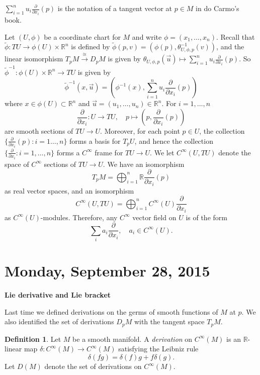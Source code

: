 \documentclass{amsart}
\numberwithin{equation}{section}
\newcommand{\bR}{\mathbb{R}}
\theoremstyle{definition}
\newtheorem{definition}{Definition} [section]
\theoremstyle{theorem}
\begin{document}
$\displaystyle{ \sum_{i=1}^n u_i \frac{\partial}{\partial x_i}(p) }$ is the notation of a tangent vector at $p\in M$ in do Carmo's book.


\bigskip



Let $(U, \phi)$ be a coordinate chart for $M$ and write $\phi = (x_1, \ldots, x_n)$.  Recall that
$\widetilde{\phi}:TU\to \phi(U)\times \bR^n$ is defined by 
$\widetilde{\phi}(p,v)= (\phi(p), \theta_{U,\phi,p}^{-1}(v))$, 
and the linear isomorphism $T_p M\stackrel{\cong}{\longrightarrow} D_p M$ is given by $\theta_{U,\phi,p}(\vec{u}) \mapsto \sum_{i=1}^n u_i\frac{\partial}{\partial x_i}(p)$.
So $\widetilde{\phi}^{-1}: \phi(U)\times\bR^n \to TU$ is given by 
$$
\widetilde{\phi}^{-1}(x,\vec{u}) = (\phi^{-1}(x), \sum_{i=1}^n u_i \frac{\partial}{\partial x_i}(p) )
$$
where $x\in \phi(U)\subset \bR^n$ and $\vec{u}=(u_1,\ldots, u_n)\in \bR^n$. For $i=1,\ldots, n$
\[
\frac{\partial}{\partial x_i} : U \to TU,\quad p\mapsto (p, \frac{\partial}{\partial x_i}(p))
\]
are smooth sections of $TU\to U$. 
Moreover, for each point $p \in U$, the collection $\{ \frac{\partial}{\partial x_i}(p): i=1\ldots, n\}$ 
forms a basis for $T_pU$, and hence the collection $\{\frac{\partial}{\partial x_i}: i=1,\ldots,n\}$ 
forms a $C^\infty$ frame for $TU\to U$. We let $C^\infty(U,TU)$ denote the space of $C^\infty$ sections of $TU\to U$. 
We have an isomorphism
$$
T_p M =\bigoplus_{i=1}^n \bR\frac{\partial}{\partial x_i}(p)
$$
as real vector spaces, and an isomorphism
$$
C^\infty(U,TU) =\bigoplus_{i=1}^n C^\infty(U)\frac{\partial}{\partial x_i}
$$
as $C^\infty(U)$-modules. Therefore, any $C^\infty$ vector field on $U$ is of the form 
$$
\sum_i a_i \frac{\partial}{\partial x_i},\quad a_i \in C^\infty(U).
$$ 






\section{Monday, September 28, 2015}

\noindent
{\bf \large Lie derivative and Lie bracket}

Last time we defined derivations on the germs of smooth functions of $M$ at $p$. We also identified the set of derivations $D_pM$ with the tangent space $T_pM$. 

\begin{definition}
Let $M$ be a smooth manifold. A {\em derivation} on $C^\infty(M)$ is an $\mathbb{R}$-linear map $\delta : C^\infty(M) \to C^\infty(M)$ satisfying the Leibniz rule 
\[
\delta(fg) = \delta (f)g + f \delta(g).
\]
Let $D(M)$ denote the set of derivations on $C^\infty(M)$. 
\end{definition}
\end{document}
